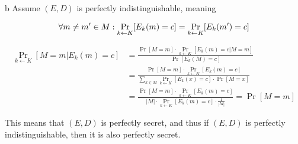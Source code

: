 \documentclass{article}
\begin{document}
\begin{paragraph}
	b Assume $(E,D)$ is perfectly indistinguishable, meaning

	\begin{equation*}
		\forall m\neq m' \in M: \Pr\limits_{k \leftarrow K}[E_k(m) = c] = \Pr\limits_{k \leftarrow K}[E_k(m') = c]\\
	\end{equation*}

	\begin{align*}
		\Pr\limits_{k \leftarrow K}[M = m | E_k(m) = c] &= \frac{\Pr[M = m] \cdot \Pr\limits_{k \leftarrow K}[E_k(m) = c | M = m]}{\Pr[E_k(M) = c]}\\
		&= \frac{\Pr[M = m] \cdot \Pr\limits_{k \leftarrow K}[E_k(m) = c]}{\sum\limits_{x \in M} \Pr\limits_{k \leftarrow K}[E_k(x) = c] \cdot \Pr[M = x]}\\
		&= \frac{\Pr[M = m] \cdot \Pr\limits_{k \leftarrow K}[E_k(m) = c]}{|M| \cdot \Pr\limits_{k \leftarrow K}[E_k(m) = c] \cdot \frac{1}{|M|}} = \Pr[M = m]
	\end{align*}

	This means that $(E,D)$ is perfectly secret, and thus if $(E,D)$ is perfectly indistinguishable, then it is also perfectly secret.
\end{paragraph}
\end{document}
